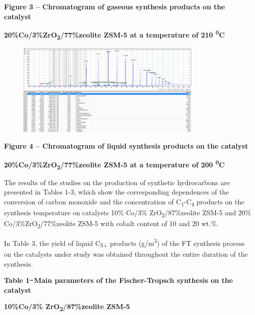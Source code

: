 \textbf{Figure 3 -- Chromatogram of gaseous synthesis products on the
catalyst}

\textbf{20\%Co/3\%ZrO\textsubscript{2}/77\%zeolite ZSM-5 at a
temperature of 210 \textsuperscript{0}C}

\begin{figure}[H]
	\centering
	\includegraphics[width=0.8\textwidth]{assets/1080}
	\caption*{}
\end{figure}

\textbf{Figure 4 -- Chromatogram of liquid synthesis products on the
catalyst}

\textbf{20\%Co/3\%ZrO\textsubscript{2}/77\%zeolite ZSM-5 at a
temperature of 200 \textsuperscript{0}C}

The results of the studies on the production of synthetic hydrocarbons
are presented in Tables 1-3, which show the corresponding dependences of
the conversion of carbon monoxide and the concentration of
C\textsubscript{1}-C\textsubscript{4} products on the synthesis
temperature on catalysts 10\% Co/3\% ZrO\textsubscript{2}/87\%zeolite
ZSM-5 and 20\% Co/3\%ZrO\textsubscript{2}/77\%zeolite ZSM-5 with cobalt
content of 10 and 20 wt.\%.

In Table 3, the yield of liquid C\textsubscript{5+} products
(g/m\textsuperscript{3}) of the FT synthesis process on the catalysts
under study was obtained throughout the entire duration of the
synthesis.

\textbf{Table 1 ̶ Main parameters of the Fischer-Tropsch synthesis on
the catalyst}

\textbf{10\%Co/3\% ZrO\textsubscript{2}/87\%zeolite ZSM-5}

